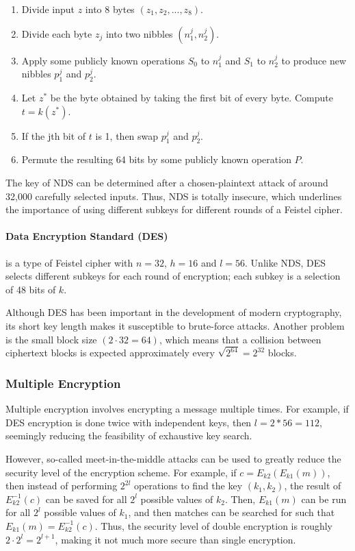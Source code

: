 \documentclass[12pt,titlepage]{article}
\begin{document}
        \begin{enumerate}
          \item Divide input $z$ into 8 bytes $(z_1, z_2, ..., z_8)$.
          \item Divide each byte $z_j$ into two nibbles $(n_1^j, n_2^j)$.
          \item Apply some publicly known operations $S_0$ to $n_1^j$ and $S_1$ to $n_2^j$ to produce new nibbles $p_1^j$ and $p_2^j$.
          \item Let $z^*$ be the byte obtained by taking the first bit of every byte. Compute $t = k(z^*)$.
          \item If the jth bit of $t$ is 1, then swap $p_1^j$ and $p_2^j$.
          \item Permute the resulting 64 bits by some publicly known operation $P$.
        \end{enumerate}

        The key of NDS can be determined after a chosen-plaintext attack of around 32,000 carefully selected inputs. Thus, NDS is totally insecure, which underlines
        the importance of using different subkeys for different rounds of a Feistel cipher.

        \paragraph{Data Encryption Standard (DES)} is a type of Feistel cipher with $n = 32$, $h = 16$ and $l = 56$. Unlike NDS, DES selects different subkeys for
        each round of encryption; each subkey is a selection of 48 bits of $k$.

        Although DES has been important in the development of modern cryptography, its short key length makes it susceptible to brute-force attacks. Another problem
        is the small block size $(2 \cdot 32 = 64)$, which means that a collision between ciphertext blocks is expected approximately every $\sqrt{2^{64}} = 2^{32}$
        blocks.

      \subsubsection{Multiple Encryption}
        Multiple encryption involves encrypting a message multiple times. For example, if DES encryption is done twice with independent keys, then $l = 2*56 = 112$, seemingly
        reducing the feasibility of exhaustive key search.

        However, so-called meet-in-the-middle attacks can be used to greatly reduce the security level of the encryption scheme. For example, if $c = E_{k2}(E_{k1}(m))$,
        then instead of performing $2^{2l}$ operations to find the key $(k_1, k_2)$, the result of $E_{k2}^{-1}(c)$ can be saved for all $2^l$ possible values of $k_2$. Then,
        $E_{k1}(m)$ can be run for all $2^l$ possible values of $k_1$, and then matches can be searched for such that $E_{k1}(m) = E_{k2}^{-1}(c)$. Thus, the security level
        of double encryption is roughly $2 \cdot 2^l = 2^{l + 1}$, making it not much more secure than single encryption.
\end{document}
